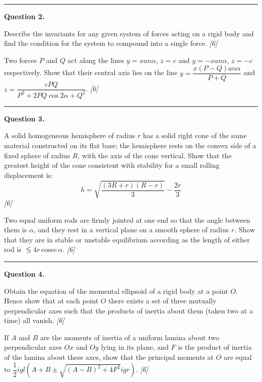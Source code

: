 \documentclass[11pt,a4paper]{article}
\newcommand{\pts}[1]{\hfill   \textit{[#1]}}
\begin{document}
\medskip\rule{\linewidth}{0.2pt}

\medskip


\noindent   \textbf{Question 2.}

\begin{parts}
  \item Describe the invariants for any given system of forces acting on a rigid body and find the condition for the system to compound into a single force. \pts{6}
  \item Two forces $P$ and $Q$ act along the lines $y = x an\alpha$, $z = c$ and $y = -x an\alpha$, $z = -c$ respectively. Show that their central axis lies on the line $y = \dfrac{x(P-Q) an\alpha}{P+Q}$ and $z = \dfrac{cP Q}{P^2 + 2PQ\cos 2\alpha + Q^2}$. \pts{6}
\end{parts}

\medskip\rule{\linewidth}{0.2pt}

\medskip


\noindent   \textbf{Question 3.}

\begin{parts}
  \item A solid homogeneous hemisphere of radius $r$ has a solid right cone of the same material constructed on its flat base; the hemisphere rests on the convex side of a fixed sphere of radius $R$, with the axis of the cone vertical. Show that the greatest height of the cone consistent with stability for a small rolling displacement is:
  \[
  h = \sqrt{\frac{(3R+r)(R-r)}{3}} - \frac{2r}{3}
  \] \pts{6}
  \item Two equal uniform rods are firmly jointed at one end so that the angle between them is $\alpha$, and they rest in a vertical plane on a smooth sphere of radius $r$. Show that they are in stable or unstable equilibrium according as the length of either rod is $\lessgtr 4r\, \text{cosec}\,\alpha$. \pts{6}
\end{parts}

\medskip\rule{\linewidth}{0.2pt}

\medskip


\noindent   \textbf{Question 4.}

\begin{parts}
  \item Obtain the equation of the momental ellipsoid of a rigid body at a point $O$. Hence show that at each point $O$ there exists a set of three mutually perpendicular axes such that the products of inertia about them (taken two at a time) all vanish. \pts{6}
  \item If $A$ and $B$ are the moments of inertia of a uniform lamina about two perpendicular axes $Ox$ and $Oy$ lying in its plane, and $F$ is the product of inertia of the lamina about these axes, show that the principal moments at $O$ are equal to $\dfrac{1}{2}igl(A+B \pm \sqrt{(A-B)^2 + 4F^2}igr)$. \pts{6}
\end{parts}
\end{document}
